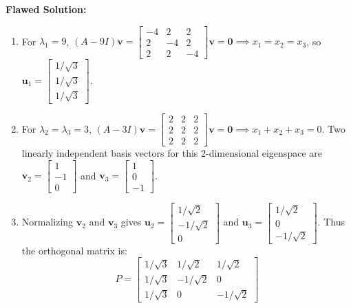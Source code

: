 \documentclass[11pt, letterpaper]{article}
\theoremstyle{definition}
\theoremstyle{remark}
\begin{document}
\textbf{Flawed Solution:}
\begin{enumerate}
    \item For $\lambda_1 = 9$, $(A - 9I)\mathbf{v} = \begin{bmatrix} -4 & 2 & 2 \\ 2 & -4 & 2 \\ 2 & 2 & -4 \end{bmatrix}\mathbf{v} = \mathbf{0} \implies x_1 = x_2 = x_3$, so $\mathbf{u}_1 = \begin{bmatrix} 1/\sqrt{3} \\ 1/\sqrt{3} \\ 1/\sqrt{3} \end{bmatrix}$.
    \item For $\lambda_2 = \lambda_3 = 3$, $(A - 3I)\mathbf{v} = \begin{bmatrix} 2 & 2 & 2 \\ 2 & 2 & 2 \\ 2 & 2 & 2 \end{bmatrix}\mathbf{v} = \mathbf{0} \implies x_1 + x_2 + x_3 = 0$.
    Two linearly independent basis vectors for this $2$-dimensional eigenspace are $\mathbf{v}_2 = \begin{bmatrix} 1 \\ -1 \\ 0 \end{bmatrix}$ and $\mathbf{v}_3 = \begin{bmatrix} 1 \\ 0 \\ -1 \end{bmatrix}$.
    \item Normalizing $\mathbf{v}_2$ and $\mathbf{v}_3$ gives $\mathbf{u}_2 = \begin{bmatrix} 1/\sqrt{2} \\ -1/\sqrt{2} \\ 0 \end{bmatrix}$ and $\mathbf{u}_3 = \begin{bmatrix} 1/\sqrt{2} \\ 0 \\ -1/\sqrt{2} \end{bmatrix}$. Thus the orthogonal matrix is:
    \[
    P = \begin{bmatrix} 1/\sqrt{3} & 1/\sqrt{2} & 1/\sqrt{2} \\ 1/\sqrt{3} & -1/\sqrt{2} & 0 \\ 1/\sqrt{3} & 0 & -1/\sqrt{2} \end{bmatrix}
    \]
\end{enumerate}
\end{document}
